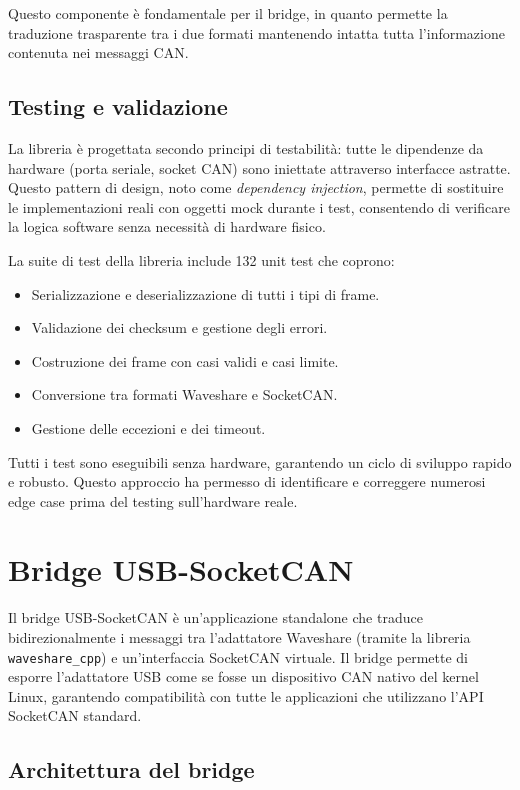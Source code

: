Questo componente è fondamentale per il bridge, in quanto permette la traduzione trasparente tra i due formati mantenendo intatta tutta l'informazione contenuta nei messaggi CAN.

\subsection{Testing e validazione}

La libreria è progettata secondo principi di testabilità: tutte le dipendenze da hardware (porta seriale, socket CAN) sono iniettate attraverso interfacce astratte. Questo pattern di design, noto come \textit{dependency injection}, permette di sostituire le implementazioni reali con oggetti mock durante i test, consentendo di verificare la logica software senza necessità di hardware fisico.

La suite di test della libreria include 132 unit test che coprono:
\begin{itemize}
    \item Serializzazione e deserializzazione di tutti i tipi di frame.
    \item Validazione dei checksum e gestione degli errori.
    \item Costruzione dei frame con casi validi e casi limite.
    \item Conversione tra formati Waveshare e SocketCAN.
    \item Gestione delle eccezioni e dei timeout.
\end{itemize}

Tutti i test sono eseguibili senza hardware, garantendo un ciclo di sviluppo rapido e robusto. Questo approccio ha permesso di identificare e correggere numerosi edge case prima del testing sull'hardware reale.

\section{Bridge USB-SocketCAN}
\label{sec:bridge_usb_socketcan}

Il bridge USB-SocketCAN è un'applicazione standalone che traduce bidirezionalmente i messaggi tra l'adattatore Waveshare (tramite la libreria \texttt{waveshare\_cpp}) e un'interfaccia SocketCAN virtuale. Il bridge permette di esporre l'adattatore USB come se fosse un dispositivo CAN nativo del kernel Linux, garantendo compatibilità con tutte le applicazioni che utilizzano l'API SocketCAN standard.

\subsection{Architettura del bridge}

